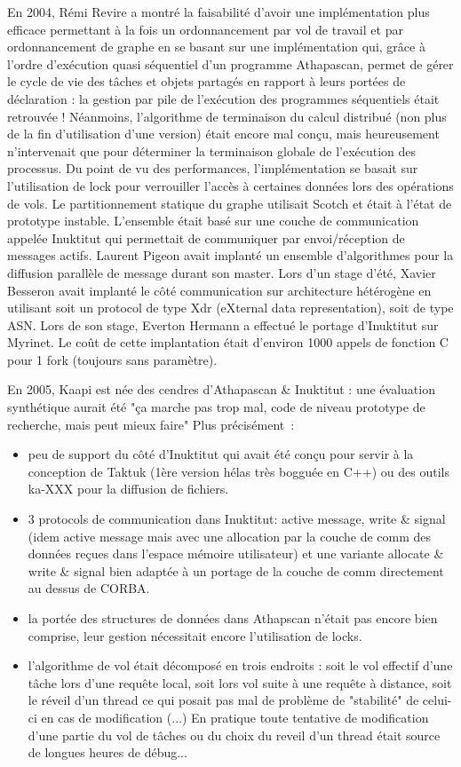 \documentclass[12pt]{report}
\begin{document}
En 2004, Rémi Revire a montré la faisabilité d'avoir une implémentation plus efficace permettant à la fois un ordonnancement par vol de travail et par ordonnancement de graphe en se basant sur une implémentation qui, grâce à l'ordre d'exécution quasi séquentiel d'un programme Athapascan, permet de gérer le cycle de vie des tâches et objets partagés en rapport à leurs portées de déclaration : la gestion par pile de l'exécution des programmes séquentiels était retrouvée ! Néanmoins, l'algorithme de terminaison du calcul distribué (non plus de la fin d'utilisation d'une version) était encore mal conçu, mais heureusement n'intervenait que pour déterminer la terminaison globale de l'exécution des processus.
Du point de vu des performances, l'implémentation se basait sur l'utilisation de lock pour verrouiller l'accès à certaines données lors des opérations de vols. Le partitionnement statique du graphe utilisait Scotch et était à l'état de prototype instable. L'ensemble était basé sur une couche de communication appelée Inuktitut qui permettait de communiquer par envoi/réception de messages actifs. 
Laurent Pigeon avait implanté un ensemble d'algorithmes pour la diffusion parallèle de message durant son master.
Lors d'un stage d'été, Xavier Besseron avait implanté le côté communication sur architecture hétérogène en utilisant soit un protocol de type Xdr (eXternal data representation), soit de type ASN.
Lors de son stage, Everton Hermann a effectué le portage d'Inuktitut sur Myrinet.
Le coût de cette implantation était d'environ 1000 appels de fonction C pour 1 fork (toujours sans paramètre).

En 2005, Kaapi est née des cendres d'Athapascan \& Inuktitut : une évaluation synthétique aurait été "ça marche pas trop mal, code de niveau prototype de recherche, mais peut mieux faire"
Plus précisément~:
\begin{itemize}
\item peu de support du côté d'Inuktitut qui avait été conçu pour servir à la conception de Taktuk (1ère version hélas très bogguée en C++) ou des outils ka-XXX pour la diffusion de fichiers.
\item 3 protocols de communication dans Inuktitut: active message, write \& signal (idem active message mais avec une allocation par la couche de comm des données reçues dans l'espace mémoire utilisateur) et une variante allocate \& write \& signal bien adaptée à un portage de la couche de comm directement au dessus de CORBA.
\item la portée des structures de données dans Athapscan n'était pas encore bien comprise, leur gestion nécessitait encore l'utilisation de locks.
\item l'algorithme de vol était décomposé en trois endroits : soit le vol effectif d'une tâche lors d'une requête local, soit lors vol suite à une requête à distance, soit le réveil d'un thread ce qui posait pas mal de problème de "stabilité" de celui-ci en cas de modification (...) En pratique toute tentative de modification d'une partie du vol de tâches ou du choix du reveil d'un thread était source de longues heures de débug...
\end{itemize}
\end{document}
